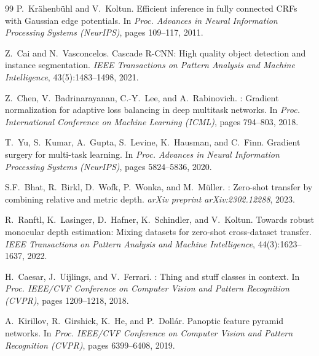 \documentclass{article}
\begin{document}
\begin{thebibliography}{99}
P.~Kr{\"a}henb{\"u}hl and V.~Koltun.
\newblock Efficient inference in fully connected {CRFs} with {G}aussian edge potentials.
\newblock In \emph{Proc. Advances in Neural Information Processing Systems (NeurIPS)}, pages 109--117, 2011.

Z.~Cai and N.~Vasconcelos.
\newblock Cascade {R-CNN}: High quality object detection and instance segmentation.
\newblock \emph{IEEE Transactions on Pattern Analysis and Machine Intelligence}, 43(5):1483--1498, 2021.

Z.~Chen, V.~Badrinarayanan, C.-Y.~Lee, and A.~Rabinovich.
: Gradient normalization for adaptive loss balancing in deep multitask networks.
\newblock In \emph{Proc. International Conference on Machine Learning (ICML)}, pages 794--803, 2018.

T.~Yu, S.~Kumar, A.~Gupta, S.~Levine, K.~Hausman, and C.~Finn.
\newblock Gradient surgery for multi-task learning.
\newblock In \emph{Proc. Advances in Neural Information Processing Systems (NeurIPS)}, pages 5824--5836, 2020.

S.F.~Bhat, R.~Birkl, D.~Wofk, P.~Wonka, and M.~M{\"u}ller.
: Zero-shot transfer by combining relative and metric depth.
\newblock \emph{arXiv preprint arXiv:2302.12288}, 2023.

R.~Ranftl, K.~Lasinger, D.~Hafner, K.~Schindler, and V.~Koltun.
\newblock Towards robust monocular depth estimation: Mixing datasets for zero-shot cross-dataset transfer.
\newblock \emph{IEEE Transactions on Pattern Analysis and Machine Intelligence}, 44(3):1623--1637, 2022.

H.~Caesar, J.~Uijlings, and V.~Ferrari.
: Thing and stuff classes in context.
\newblock In \emph{Proc. IEEE/CVF Conference on Computer Vision and Pattern Recognition (CVPR)}, pages 1209--1218, 2018.

A.~Kirillov, R.~Girshick, K.~He, and P.~Doll{\'a}r.
\newblock Panoptic feature pyramid networks.
\newblock In \emph{Proc. IEEE/CVF Conference on Computer Vision and Pattern Recognition (CVPR)}, pages 6399--6408, 2019.

\end{thebibliography}


\appendix
\end{document}
